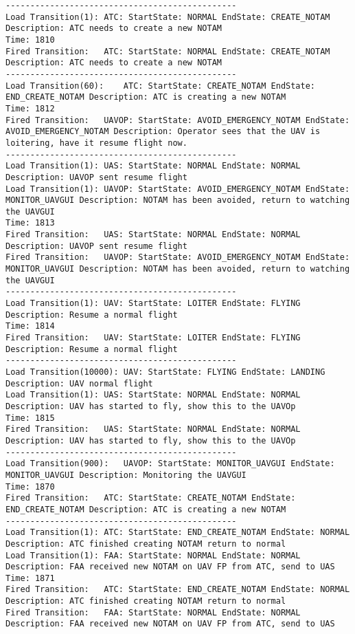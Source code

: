 \begin{spacing}{1}
\begin{verbatim}
-----------------------------------------------
Load Transition(1):	ATC: StartState: NORMAL EndState: CREATE_NOTAM Description: ATC needs to create a new NOTAM
Time: 1810
Fired Transition:	ATC: StartState: NORMAL EndState: CREATE_NOTAM Description: ATC needs to create a new NOTAM
-----------------------------------------------
Load Transition(60):	ATC: StartState: CREATE_NOTAM EndState: END_CREATE_NOTAM Description: ATC is creating a new NOTAM
Time: 1812
Fired Transition:	UAVOP: StartState: AVOID_EMERGENCY_NOTAM EndState: AVOID_EMERGENCY_NOTAM Description: Operator sees that the UAV is loitering, have it resume flight now.
-----------------------------------------------
Load Transition(1):	UAS: StartState: NORMAL EndState: NORMAL Description: UAVOP sent resume flight
Load Transition(1):	UAVOP: StartState: AVOID_EMERGENCY_NOTAM EndState: MONITOR_UAVGUI Description: NOTAM has been avoided, return to watching the UAVGUI
Time: 1813
Fired Transition:	UAS: StartState: NORMAL EndState: NORMAL Description: UAVOP sent resume flight
Fired Transition:	UAVOP: StartState: AVOID_EMERGENCY_NOTAM EndState: MONITOR_UAVGUI Description: NOTAM has been avoided, return to watching the UAVGUI
-----------------------------------------------
Load Transition(1):	UAV: StartState: LOITER EndState: FLYING Description: Resume a normal flight
Time: 1814
Fired Transition:	UAV: StartState: LOITER EndState: FLYING Description: Resume a normal flight
-----------------------------------------------
Load Transition(10000):	UAV: StartState: FLYING EndState: LANDING Description: UAV normal flight
Load Transition(1):	UAS: StartState: NORMAL EndState: NORMAL Description: UAV has started to fly, show this to the UAVOp
Time: 1815
Fired Transition:	UAS: StartState: NORMAL EndState: NORMAL Description: UAV has started to fly, show this to the UAVOp
-----------------------------------------------
Load Transition(900):	UAVOP: StartState: MONITOR_UAVGUI EndState: MONITOR_UAVGUI Description: Monitoring the UAVGUI
Time: 1870
Fired Transition:	ATC: StartState: CREATE_NOTAM EndState: END_CREATE_NOTAM Description: ATC is creating a new NOTAM
-----------------------------------------------
Load Transition(1):	ATC: StartState: END_CREATE_NOTAM EndState: NORMAL Description: ATC finished creating NOTAM return to normal
Load Transition(1):	FAA: StartState: NORMAL EndState: NORMAL Description: FAA received new NOTAM on UAV FP from ATC, send to UAS
Time: 1871
Fired Transition:	ATC: StartState: END_CREATE_NOTAM EndState: NORMAL Description: ATC finished creating NOTAM return to normal
Fired Transition:	FAA: StartState: NORMAL EndState: NORMAL Description: FAA received new NOTAM on UAV FP from ATC, send to UAS

\end{verbatim}
\end{spacing}
